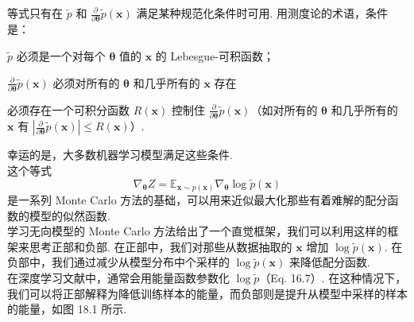 等式只有在 $\tilde{p}$ 和 $\frac{\partial}{\partial \pmb{\theta}} \tilde{p}(\mathbf{x})$ 满足某种规范化条件时可用. 用测度论的术语，条件是：
\begin{enumerate*}[label={\roman*)}]
\item $\tilde{p}$ 必须是一个对每个 $\pmb{\theta}$ 值的 $\pmb{x}$ 的 Lebesgue-可积函数；
\item $\frac{\partial}{\partial \pmb{\theta}} \tilde{p}(\mathbf{x})$ 必须对所有的 $\pmb{\theta}$ 和几乎所有的 $\pmb{x}$ 存在
\item 必须存在一个可积分函数 $R(\pmb{x})$ 控制住 $\frac{\partial}{\partial \pmb{\theta}} \tilde{p}(\mathbf{x})$（如对所有的 $\pmb{\theta}$ 和几乎所有的 $\pmb{x}$ 有 $|\frac{\partial}{\partial \pmb{\theta}}\tilde{p}(\mathbf{x})|\leq R(\pmb{x})$）.
\end{enumerate*}

幸运的是，大多数机器学习模型满足这些条件.\\

这个等式
\begin{equation}  \label{eq:pyth}
\nabla_{\pmb{\theta}} Z = \mathbb{E}_{\mathbf{x}\sim p(\mathbf{x})} \nabla_{\pmb{\theta}} \log \tilde{p}(\mathbf{x})
\end{equation}
是一系列 Monte Carlo 方法的基础，可以用来近似最大化那些有着难解的配分函数的模型的似然函数.\\

学习无向模型的 Monte Carlo 方法给出了一个直觉框架，我们可以利用这样的框架来思考正部和负部. 在正部中，我们对那些从数据抽取的 $\pmb{x}$ 增加 $\log \tilde{p}(\mathbf{x})$. 在负部中，我们通过减少从模型分布中个采样的 $\log \tilde{p}(\mathbf{x})$ 来降低配分函数.\\

在深度学习文献中，通常会用能量函数参数化 $\log \tilde{p}$（Eq. 16.7）. 在这种情况下，我们可以将正部解释为降低训练样本的能量，而负部则是提升从模型中采样的样本的能量，如图 18.1 所示.


